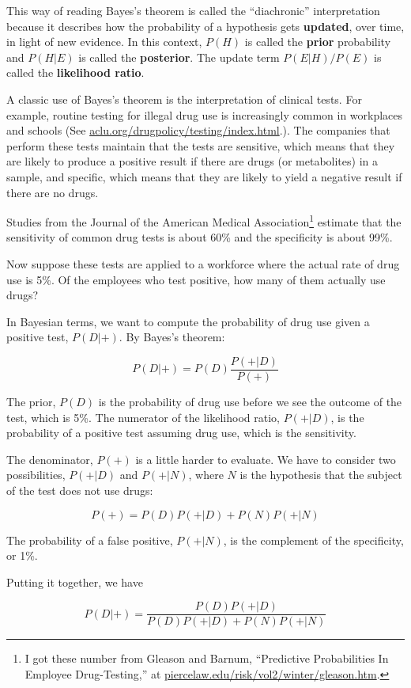 \documentclass[12pt]{book}
\begin{document}
This way of reading Bayes's theorem is called the ``diachronic''
interpretation because it describes how the probability of a
hypothesis gets {\bf updated}, over time, in light of new evidence.
In this context, $P(H)$ is called the {\bf prior} probability and
$P(H|E)$ is called the {\bf posterior}.  The update term $P(E|H)/P(E)$
is called the {\bf likelihood ratio}.

A classic use of Bayes's theorem is the interpretation of clinical
tests.  For example, routine testing for illegal drug use is
increasingly common in workplaces and schools (See
\url{aclu.org/drugpolicy/testing/index.html}.).  The companies that
perform these tests maintain that the tests are sensitive, which means
that they are likely to produce a positive result if there are drugs
(or metabolites) in a sample, and specific, which means that they are
likely to yield a negative result if there are no drugs.

Studies from the Journal of the American Medical
Association\footnote{I got these number from Gleason and Barnum,
  ``Predictive Probabilities In Employee Drug-Testing,'' at
  \url{piercelaw.edu/risk/vol2/winter/gleason.htm}.} estimate that
the sensitivity of common drug tests is about 60\% and the specificity
is about 99\%.

Now suppose these tests are applied to a workforce where the
actual rate of drug use is 5\%.  Of the employees who test positive,
how many of them actually use drugs?

In Bayesian terms, we want to compute the probability of
drug use given a positive test, $P(D|+)$.  By Bayes's theorem:

\[ P(D|+) = P(D) \frac{P(+|D)}{P(+)} \]

The prior, $P(D)$ is the probability of drug use before we
see the outcome of the test, which is 5\%.
The numerator of the likelihood ratio, $P(+|D)$, is the probability
of a positive test assuming drug use, which is the sensitivity.

The denominator, $P(+)$ is a little harder to evaluate.  We have to
consider two possibilities, $P(+|D)$ and $P(+|N)$, where $N$ is the
hypothesis that the subject of the test does not use drugs:

\[ P(+) = P(D) P(+|D) + P(N) P(+|N) \]

The probability of a false positive, $P(+|N)$, is the complement
of the specificity, or 1\%.

Putting it together, we have

\[ P(D|+) = \frac{P(D) P(+|D)}{P(D) P(+|D) + P(N) P(+|N)}\]
\end{document}
